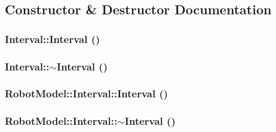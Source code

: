 \subsection{Constructor \& Destructor Documentation}
\hypertarget{class_robot_model_1_1_interval_ae48b9a9e9f672f81977627b609e32429}{
\subsubsection[{Interval}]{\setlength{\rightskip}{0pt plus 5cm}Interval::Interval ()}}
\label{class_robot_model_1_1_interval_ae48b9a9e9f672f81977627b609e32429}
\hypertarget{class_robot_model_1_1_interval_a923e1717a3dedfe1ba90f81fcb26d5c5}{
\subsubsection[{$\sim$Interval}]{\setlength{\rightskip}{0pt plus 5cm}Interval::$\sim$Interval ()}}
\label{class_robot_model_1_1_interval_a923e1717a3dedfe1ba90f81fcb26d5c5}
\hypertarget{class_robot_model_1_1_interval_a84b5182a1624031b0793d938dcdfa63d}{
\subsubsection[{Interval}]{\setlength{\rightskip}{0pt plus 5cm}RobotModel::Interval::Interval ()}}
\label{class_robot_model_1_1_interval_a84b5182a1624031b0793d938dcdfa63d}
\hypertarget{class_robot_model_1_1_interval_a0bcaeeb61bc82c2d3e900786ebfe2bd9}{
\subsubsection[{$\sim$Interval}]{\setlength{\rightskip}{0pt plus 5cm}RobotModel::Interval::$\sim$Interval ()}}
\label{class_robot_model_1_1_interval_a0bcaeeb61bc82c2d3e900786ebfe2bd9}


